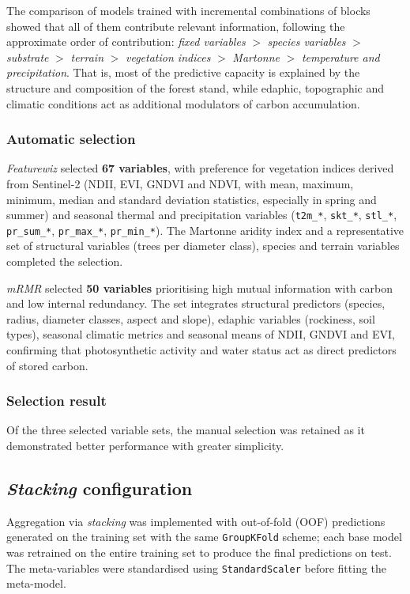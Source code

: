 The comparison of models trained with incremental combinations of blocks showed that all of them contribute relevant information, following the approximate order of contribution: \textit{fixed variables} $>$ \textit{species variables} $>$ \textit{substrate} $>$ \textit{terrain} $>$ \textit{vegetation indices} $>$ \textit{Martonne} $>$ \textit{temperature and precipitation}. That is, most of the predictive capacity is explained by the structure and composition of the forest stand, while edaphic, topographic and climatic conditions act as additional modulators of carbon accumulation.

\subsubsection{Automatic selection}

\textit{Featurewiz} selected \textbf{67 variables}, with preference for vegetation indices derived from Sentinel-2 (NDII, EVI, GNDVI and NDVI, with mean, maximum, minimum, median and standard deviation statistics, especially in spring and summer) and seasonal thermal and precipitation variables (\texttt{t2m\_*}, \texttt{skt\_*}, \texttt{stl\_*}, \texttt{pr\_sum\_*}, \texttt{pr\_max\_*}, \texttt{pr\_min\_*}). The Martonne aridity index and a representative set of structural variables (trees per diameter class), species and terrain variables completed the selection.

\textit{mRMR} selected \textbf{50 variables} prioritising high mutual information with carbon and low internal redundancy. The set integrates structural predictors (species, radius, diameter classes, aspect and slope), edaphic variables (rockiness, soil types), seasonal climatic metrics and seasonal means of NDII, GNDVI and EVI, confirming that photosynthetic activity and water status act as direct predictors of stored carbon.

\subsubsection{Selection result}
Of the three selected variable sets, the manual selection was retained as it demonstrated better performance with greater simplicity.

\subsection{\textit{Stacking} configuration}

Aggregation via \textit{stacking} was implemented with out-of-fold (OOF) predictions generated on the training set with the same \texttt{GroupKFold} scheme; each base model was retrained on the entire training set to produce the final predictions on test. The meta-variables were standardised using \texttt{StandardScaler} before fitting the meta-model.

